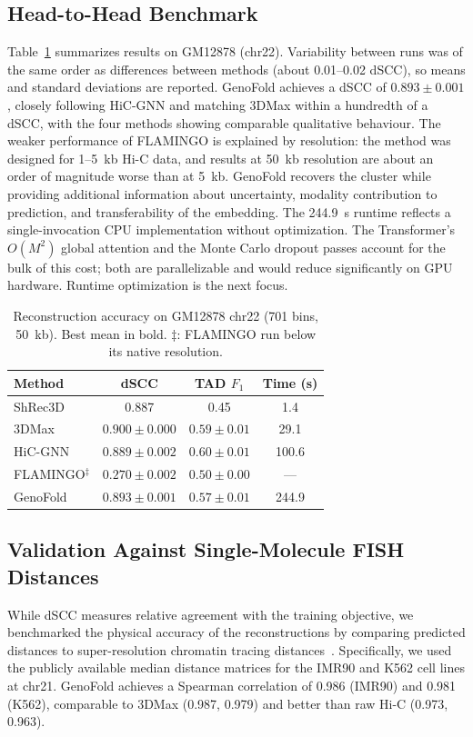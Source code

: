 \documentclass[conference]{IEEEtran}
\begin{document}
\subsection{Head-to-Head Benchmark}
Table~\ref{tab:benchmark} summarizes results on GM12878 (chr22).
Variability between runs was of the same order as differences between
methods (about 0.01--0.02 dSCC), so means and standard deviations are
reported. GenoFold achieves a dSCC of $0.893 \pm 0.001$, closely
following HiC-GNN and matching 3DMax within a hundredth of a dSCC, with
the four methods showing comparable qualitative behaviour. The weaker
performance of FLAMINGO is explained by resolution: the method was
designed for 1--5~kb Hi-C data, and results at 50~kb resolution are
about an order of magnitude worse than at 5~kb. GenoFold recovers the
cluster while providing additional information about uncertainty,
modality contribution to prediction, and transferability of the
embedding. The 244.9~s runtime reflects a single-invocation CPU
implementation without optimization. The Transformer's $O(M^2)$ global
attention and the Monte Carlo dropout passes account for the bulk of
this cost; both are parallelizable and would reduce significantly on GPU
hardware. Runtime optimization is the next focus.

\begin{table}[t]
\caption{Reconstruction accuracy on GM12878 chr22 (701 bins, 50~kb).
Best mean in bold. $\ddagger$: FLAMINGO run below its native
resolution.}
\label{tab:benchmark}
\centering
\begin{tabular}{@{}lccc@{}}
\toprule
\textbf{Method} & \textbf{dSCC} & \textbf{TAD $F_1$} & \textbf{Time (s)} \\
\midrule
ShRec3D            & 0.887                      & 0.45                   & 1.4 \\
3DMax              & $\mathbf{0.900 \pm 0.000}$ & $0.59 \pm 0.01$        & 29.1 \\
HiC-GNN            & $0.889 \pm 0.002$          & $\mathbf{0.60 \pm 0.01}$ & 100.6 \\
FLAMINGO$^\ddagger$ & $0.270 \pm 0.002$         & $0.50 \pm 0.00$        & --- \\
GenoFold           & $0.893 \pm 0.001$          & $0.57 \pm 0.01$        & 244.9 \\
\bottomrule
\end{tabular}
\end{table}

\subsection{Validation Against Single-Molecule FISH Distances}
While dSCC measures relative agreement with the training objective, we
benchmarked the physical accuracy of the reconstructions by comparing
predicted distances to super-resolution chromatin tracing
distances~\cite{bintu2018}. Specifically, we used the publicly available
median distance matrices for the IMR90 and K562 cell lines at chr21.
GenoFold achieves a Spearman correlation of 0.986 (IMR90) and 0.981
(K562), comparable to 3DMax (0.987, 0.979) and better than raw Hi-C
(0.973, 0.963).
\end{document}
